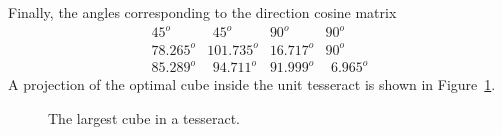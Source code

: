 Finally, the angles corresponding to the direction cosine matrix
\begin{equation*}
\begin{array}{llll}
 45    ^o & ~\,45    ^o &  90    ^o &   90    ^o \\
 78.265^o &   101.735^o &  16.717^o &   90    ^o \\
 85.289^o & ~\,94.711^o &  91.999^o & ~\,6.965^o
\end{array}
\end{equation*}
A projection of the optimal cube inside the unit tesseract is shown in
Figure~\ref{fig3}.
\begin{figure}
\begin{center}
\end{center}
\vspace{-0.2in}
\caption{The largest cube in a tesseract.}
\label{fig3}
\end{figure}
